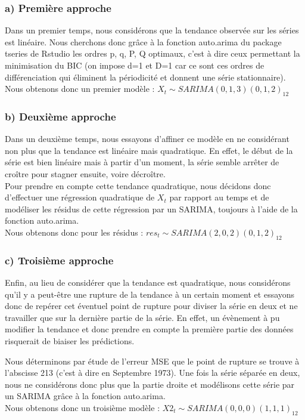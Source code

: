 \documentclass[12pt,a4paper]{book}
\newcommand{\1}{\mathds{1}}
\begin{document}
\subsubsection{a) Première approche}
  
Dans un premier temps, nous considérons que la tendance observée sur les séries est linéaire. Nous cherchons donc grâce à la fonction auto.arima du package tseries de Rstudio les ordres p, q, P, Q optimaux, c'est à dire ceux permettant la minimisation du BIC (on impose d=1 et D=1 car ce sont ces ordres de différenciation qui éliminent la périodicité et donnent une série stationnaire).
\noindent
\\
Nous obtenons donc un premier modèle :
$X_t \sim SARIMA(0,1,3)(0,1,2)_{12}$

\subsubsection{b) Deuxième approche}

Dans un deuxième temps, nous essayons d'affiner ce modèle en ne considérant non plus que la tendance est linéaire mais quadratique. En effet, le début de la série est bien linéaire mais à partir d'un moment, la série semble arrêter de croître pour stagner ensuite, voire décroître. \\
Pour prendre en compte cette tendance quadratique, nous décidons donc d'effectuer une régression quadratique de $X_t$ par rapport au temps et de modéliser les résidus de cette régression par un SARIMA, toujours à l'aide de la fonction auto.arima.\\
Nous obtenons donc pour les résidus : $res_t \sim SARIMA(2,0,2)(0,1,2)_{12}$ 
  
\subsubsection{c) Troisième approche}
Enfin, au lieu de considérer que la tendance est quadratique, nous considérons qu'il y a peut-être une rupture de la tendance à un certain moment et essayons donc de repérer cet éventuel point de rupture pour diviser la série en deux et ne travailler que sur la dernière partie de la série. En effet, un évènement à pu modifier la tendance et donc prendre en compte la première partie des données risquerait de biaiser les prédictions.

\vspace{5 mm}
\noindent
Nous déterminons par étude de l'erreur MSE que le point de rupture se trouve à l'abscisse 213 (c'est à dire en Septembre 1973). Une fois la série séparée en deux, nous ne considérons donc plus que la partie droite et modélisons cette série par un SARIMA grâce à la fonction auto.arima.\\
Nous obtenons donc un troisième modèle : $X2_t \sim SARIMA(0,0,0)(1,1,1)_{12}$
\end{document}
